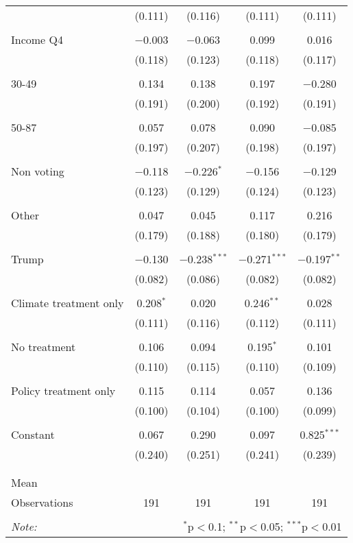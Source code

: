 \begin{tabular}{@{\extracolsep{5pt}}lcccc}
  & (0.111) & (0.116) & (0.111) & (0.111) \\ 
  & & & & \\ 
 Income Q4 & $-$0.003 & $-$0.063 & 0.099 & 0.016 \\ 
  & (0.118) & (0.123) & (0.118) & (0.117) \\ 
  & & & & \\ 
 30-49 & 0.134 & 0.138 & 0.197 & $-$0.280 \\ 
  & (0.191) & (0.200) & (0.192) & (0.191) \\ 
  & & & & \\ 
 50-87 & 0.057 & 0.078 & 0.090 & $-$0.085 \\ 
  & (0.197) & (0.207) & (0.198) & (0.197) \\ 
  & & & & \\ 
 Non voting & $-$0.118 & $-$0.226$^{*}$ & $-$0.156 & $-$0.129 \\ 
  & (0.123) & (0.129) & (0.124) & (0.123) \\ 
  & & & & \\ 
 Other & 0.047 & 0.045 & 0.117 & 0.216 \\ 
  & (0.179) & (0.188) & (0.180) & (0.179) \\ 
  & & & & \\ 
 Trump & $-$0.130 & $-$0.238$^{***}$ & $-$0.271$^{***}$ & $-$0.197$^{**}$ \\ 
  & (0.082) & (0.086) & (0.082) & (0.082) \\ 
  & & & & \\ 
 Climate treatment only & 0.208$^{*}$ & 0.020 & 0.246$^{**}$ & 0.028 \\ 
  & (0.111) & (0.116) & (0.112) & (0.111) \\ 
  & & & & \\ 
 No treatment & 0.106 & 0.094 & 0.195$^{*}$ & 0.101 \\ 
  & (0.110) & (0.115) & (0.110) & (0.109) \\ 
  & & & & \\ 
 Policy treatment only & 0.115 & 0.114 & 0.057 & 0.136 \\ 
  & (0.100) & (0.104) & (0.100) & (0.099) \\ 
  & & & & \\ 
 Constant & 0.067 & 0.290 & 0.097 & 0.825$^{***}$ \\ 
  & (0.240) & (0.251) & (0.241) & (0.239) \\ 
  & & & & \\ 
\hline \\[-1.8ex] 
Mean &  &  &  &  \\ 
Observations & 191 & 191 & 191 & 191 \\ 
\hline 
\hline \\[-1.8ex] 
\textit{Note:}  & \multicolumn{4}{r}{$^{*}$p$<$0.1; $^{**}$p$<$0.05; $^{***}$p$<$0.01} \\ 
\end{tabular} 

